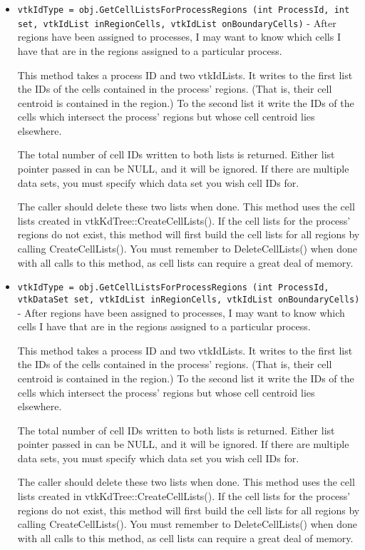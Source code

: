\begin{itemize}
\item  \verb|vtkIdType = obj.GetCellListsForProcessRegions (int ProcessId, int set, vtkIdList inRegionCells, vtkIdList onBoundaryCells)| -    After regions have been assigned to processes, I may want to know
   which cells I have that are in the regions assigned to a particular
   process.

   This method takes a process ID and two vtkIdLists.  It
   writes to the first list the IDs of the cells
   contained in the process' regions.  (That is, their cell
   centroid is contained in the region.)  To the second list it
   write the IDs of the cells which intersect the process' regions 
   but whose cell centroid lies elsewhere.

   The total number of cell IDs written to both lists is returned.  
   Either list pointer passed in can be NULL, and it will be ignored. 
   If there are multiple data sets, you must specify which data set
   you wish cell IDs for.  

   The caller should delete these two lists when done.  This method 
   uses the cell lists created in vtkKdTree::CreateCellLists().
   If the cell lists for the process' regions do not exist, this
   method will first build the cell lists for all regions by calling
   CreateCellLists().  You must remember to DeleteCellLists() when 
   done with all calls to this method, as cell lists can require a 
   great deal of memory.  

\item  \verb|vtkIdType = obj.GetCellListsForProcessRegions (int ProcessId, vtkDataSet set, vtkIdList inRegionCells, vtkIdList onBoundaryCells)| -    After regions have been assigned to processes, I may want to know
   which cells I have that are in the regions assigned to a particular
   process.

   This method takes a process ID and two vtkIdLists.  It
   writes to the first list the IDs of the cells
   contained in the process' regions.  (That is, their cell
   centroid is contained in the region.)  To the second list it
   write the IDs of the cells which intersect the process' regions 
   but whose cell centroid lies elsewhere.

   The total number of cell IDs written to both lists is returned.  
   Either list pointer passed in can be NULL, and it will be ignored. 
   If there are multiple data sets, you must specify which data set
   you wish cell IDs for.  

   The caller should delete these two lists when done.  This method 
   uses the cell lists created in vtkKdTree::CreateCellLists().
   If the cell lists for the process' regions do not exist, this
   method will first build the cell lists for all regions by calling
   CreateCellLists().  You must remember to DeleteCellLists() when 
   done with all calls to this method, as cell lists can require a 
   great deal of memory.  


\end{itemize}
